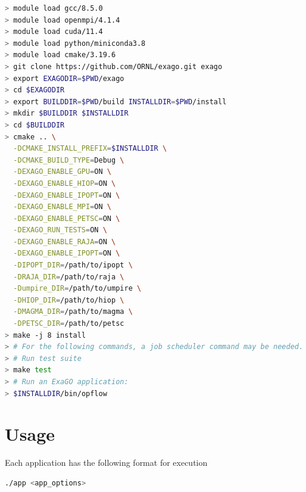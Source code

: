 \begin{lstlisting}[language=bash,caption={\exago build with all options enabled}]
> module load gcc/8.5.0
> module load openmpi/4.1.4
> module load cuda/11.4
> module load python/miniconda3.8
> module load cmake/3.19.6
> git clone https://github.com/ORNL/exago.git exago
> export EXAGODIR=$PWD/exago
> cd $EXAGODIR
> export BUILDDIR=$PWD/build INSTALLDIR=$PWD/install
> mkdir $BUILDDIR $INSTALLDIR
> cd $BUILDDIR
> cmake .. \
  -DCMAKE_INSTALL_PREFIX=$INSTALLDIR \
  -DCMAKE_BUILD_TYPE=Debug \
  -DEXAGO_ENABLE_GPU=ON \
  -DEXAGO_ENABLE_HIOP=ON \
  -DEXAGO_ENABLE_IPOPT=ON \
  -DEXAGO_ENABLE_MPI=ON \
  -DEXAGO_ENABLE_PETSC=ON \
  -DEXAGO_RUN_TESTS=ON \
  -DEXAGO_ENABLE_RAJA=ON \
  -DEXAGO_ENABLE_IPOPT=ON \
  -DIPOPT_DIR=/path/to/ipopt \
  -DRAJA_DIR=/path/to/raja \
  -Dumpire_DIR=/path/to/umpire \
  -DHIOP_DIR=/path/to/hiop \
  -DMAGMA_DIR=/path/to/magma \
  -DPETSC_DIR=/path/to/petsc
> make -j 8 install
> # For the following commands, a job scheduler command may be needed.
> # Run test suite
> make test
> # Run an ExaGO application:
> $INSTALLDIR/bin/opflow
\end{lstlisting}

\section{Usage}

Each \exago application has the following format for execution
\begin{lstlisting}[language=bash]
  ./app <app_options>
\end{lstlisting}

